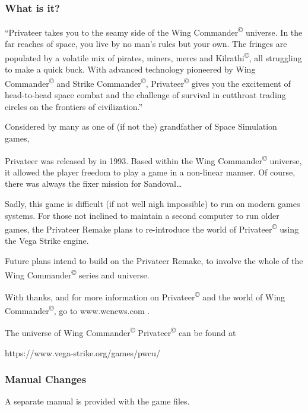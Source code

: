 \documentclass{article}
\begin{document}
\subsubsection{ What is it? }

``Privateer takes you to the seamy side of the Wing Commander\textsuperscript{\copyright}  universe. In the far reaches of space, you live by no man's rules but your own. The fringes are populated by a volatile mix of pirates, miners, mercs and Kilrathi\textsuperscript{\copyright}, all struggling to make a quick buck. With advanced technology pioneered by Wing Commander\textsuperscript{\copyright} and Strike Commander\textsuperscript{\copyright}, Privateer\textsuperscript{\copyright}  gives you the excitement of head-to-head space combat and the challenge of survival in cutthroat trading circles on the frontiers of civilization.'' 

Considered by many as one of (if not the) grandfather of Space Simulation games, 

Privateer was released by in 1993. Based within the Wing Commander\textsuperscript{\copyright}  universe, it allowed the player freedom to play a game in a non-linear manner. Of course, there was always the fixer mission for Sandoval\dots  

Sadly, this game is difficult (if not well nigh impossible) to run on modern games systems. For those not inclined to maintain a second computer to run older games, the Privateer Remake plans to re-introduce the world of Privateer\textsuperscript{\copyright} using the Vega Strike engine. 

Future plans intend to build on the Privateer Remake, to involve the whole of the Wing Commander\textsuperscript{\copyright}  series and universe. 

With thanks, and for more information on Privateer\textsuperscript{\copyright} and the world of Wing Commander\textsuperscript{\copyright}, go to www.wcnews.com . 

The universe of Wing Commander\textsuperscript{\copyright} Privateer\textsuperscript{\copyright} can be found at 

https://www.vega-strike.org/games/pwcu/

\subsubsection{ Manual Changes }

A separate manual is provided with the game files. 
\end{document}
